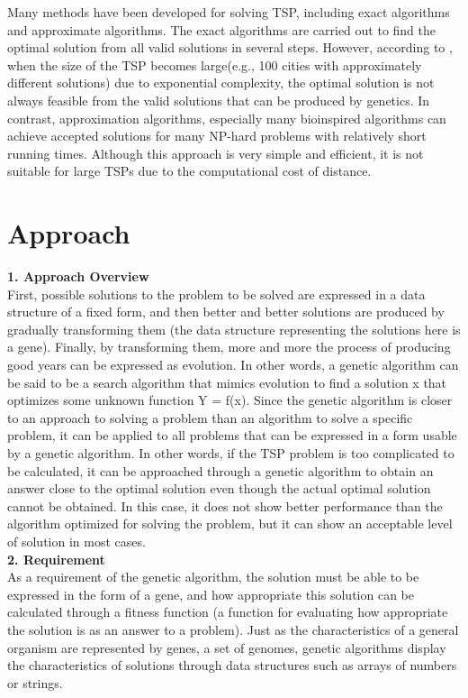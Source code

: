 \documentclass[12pt]{article}
\begin{document}
Many methods have been developed for solving TSP, including exact algorithms and approximate algorithms. The exact algorithms are carried out to find the optimal solution from all valid solutions in several steps. However, according to \cite{helsgaun2000effective}, when the size of the TSP becomes large(e.g., 100 cities with approximately different solutions) due to exponential complexity, the optimal solution is not always feasible from the valid solutions that can be produced by genetics. In contrast, approximation algorithms, especially many bioinspired algorithms can achieve accepted solutions for many NP-hard problems with relatively short running times\cite{huang2015proposed}. Although this approach is very simple and efficient, it is not suitable for large TSPs due to the computational cost of distance.

\section*{Approach}
\textbf{1. Approach Overview} \\

First, possible solutions to the problem to be solved are expressed in a data structure of a fixed form, and then better and better solutions are produced by gradually transforming them (the data structure representing the solutions here is a gene). Finally, by transforming them, more and more the process of producing good years can be expressed as evolution. In other words, a genetic algorithm can be said to be a search algorithm that mimics evolution to find a solution x that optimizes some unknown function Y = f(x). Since the genetic algorithm is closer to an approach to solving a problem than an algorithm to solve a specific problem, it can be applied to all problems that can be expressed in a form usable by a genetic algorithm. In other words, if the TSP problem is too complicated to be calculated, it can be approached through a genetic algorithm to obtain an answer close to the optimal solution even though the actual optimal solution cannot be obtained. In this case, it does not show better performance than the algorithm optimized for solving the problem, but it can show an acceptable level of solution in most cases.\\

\textbf{2. Requirement} \\

As a requirement of the genetic algorithm, the solution must be able to be expressed in the form of a gene, and how appropriate this solution can be calculated through a fitness function (a function for evaluating how appropriate the solution is as an answer to a problem). Just as the characteristics of a general organism are represented by genes, a set of genomes, genetic algorithms display the characteristics of solutions through data structures such as arrays of numbers or strings. \\
\end{document}

